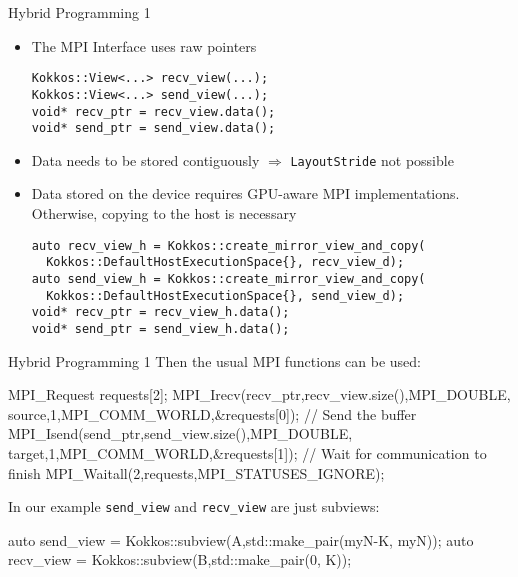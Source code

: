 \begin{frame}[fragile]{Hybrid Programming 1}
\begin{itemize}
 \item The MPI Interface uses raw pointers
 \begin{lstlisting}
Kokkos::View<...> recv_view(...);
Kokkos::View<...> send_view(...);
void* recv_ptr = recv_view.data();
void* send_ptr = send_view.data();
  \end{lstlisting}
 \item Data needs to be stored contiguously $\Rightarrow$ \texttt{LayoutStride} not possible
 \item Data stored on the device requires GPU-aware MPI implementations. Otherwise, copying to the host is necessary
 \begin{lstlisting}
auto recv_view_h = Kokkos::create_mirror_view_and_copy(
  Kokkos::DefaultHostExecutionSpace{}, recv_view_d);
auto send_view_h = Kokkos::create_mirror_view_and_copy(
  Kokkos::DefaultHostExecutionSpace{}, send_view_d);
void* recv_ptr = recv_view_h.data();
void* send_ptr = send_view_h.data();
  \end{lstlisting}
\end{itemize}
\end{frame}

\begin{frame}[fragile]{Hybrid Programming 1}
Then the usual MPI functions can be used:

\vspace{10pt}
 \begin{code}[keywords={MPI_Request,MPI_Irecv,MPI_Isend,MPI_Waitall}]
MPI_Request requests[2];
MPI_Irecv(recv_ptr,recv_view.size(),MPI_DOUBLE,
          source,1,MPI_COMM_WORLD,&requests[0]);
// Send the buffer
MPI_Isend(send_ptr,send_view.size(),MPI_DOUBLE,
          target,1,MPI_COMM_WORLD,&requests[1]);
// Wait for communication to finish
MPI_Waitall(2,requests,MPI_STATUSES_IGNORE);
  \end{code}

\pause
\vspace{10pt}
In our example \texttt{send\_view} and \texttt{recv\_view} are just subviews:

\vspace{5pt}
\begin{code}[keywords={subview,make_pair,auto}]
auto send_view = Kokkos::subview(A,std::make_pair(myN-K, myN));
auto recv_view = Kokkos::subview(B,std::make_pair(0, K));
\end{code}
\end{frame}

